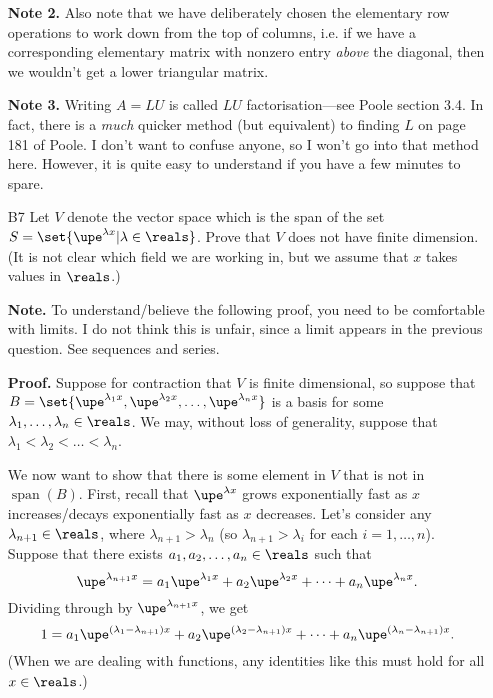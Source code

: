 \documentclass[english,12pt,a4paper]{scrartcl}
\DeclareMathOperator{\spn}{span}
\begin{document}
\begin{itemize}
    \textbf{Note 2.} Also note that we have deliberately chosen the elementary 
    row operations to work down from the top of columns, i.e. if we have a 
    corresponding elementary matrix with nonzero entry \emph{above} the 
    diagonal, then we wouldn't get a lower triangular matrix.

    \textbf{Note 3.} Writing $A = LU$ is called $LU$ factorisation---see Poole 
    section 3.4. In fact, there is a \emph{much} quicker method (but 
    equivalent) to finding $L$ on page 181 of Poole. I don't want to confuse 
    anyone, so I won't go into that method here. However, it is quite easy to 
    understand if you have a few minutes to spare.
  \item[B7] Let $V$ denote the vector space which is the span of the set $S = 
    \set{\upe^{\lambda x} | \lambda \in \reals}$. Prove that $V$ does not have 
    finite dimension. (It is not clear which field we are working in, but we 
    assume that $x$ takes values in $\reals$.)

    \textbf{Note.} To understand/believe the following proof, you need to be 
    comfortable with limits. I do not think this is unfair, since a limit 
    appears in the previous question. See sequences and series.

    \textbf{Proof.} Suppose for contraction that $V$ is finite dimensional, so 
    suppose that $B = \set{\upe^{\lambda_1 x}, \upe^{\lambda_2 x}, \dots, 
    \upe^{\lambda_n x}}$ is a basis for some $\lambda_1, \dots, \lambda_n \in 
    \reals$. We may, without loss of generality, suppose that $\lambda_1 < 
    \lambda_2 < \dots < \lambda_n$.
    
    We now want to show that there is some element in $V$ that is not in 
    $\spn(B)$. First, recall that $\upe^{\lambda x}$ grows exponentially fast 
    as $x$ increases/decays exponentially fast as $x$ decreases. Let's consider 
    any $\lambda_{n + 1} \in \reals$, where $\lambda_{n + 1} > \lambda_n$ (so 
    $\lambda_{n + 1} > \lambda_i$ for each $i = 1, \dots, n$). Suppose that 
    there exists $a_1, a_2, \dots, a_n \in \reals$ such that
    \[
      \upe^{\lambda_{n + 1} x} = a_1 \upe^{\lambda_1 x} + a_2 \upe^{\lambda_2 
      x} + \dots + a_n \upe^{\lambda_n x}.
    \]
    Dividing through by $\upe^{\lambda_{n + 1} x}$, we get
    \begin{equation} \label{eqn:sum2}
      1 = a_1 \upe^{(\lambda_1 - \lambda_{n + 1}) x} + a_2 \upe^{(\lambda_2 - 
        \lambda_{n + 1}) x} + \dots + a_n \upe^{(\lambda_n - \lambda_{n + 1}) 
      x}.
    \end{equation}
    (When we are dealing with functions, any identities like this must hold for 
    all $x \in \reals$.)
    

\end{itemize}
\end{document}
